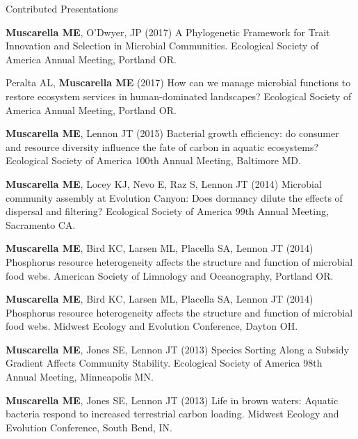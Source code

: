 \documentclass{resume} %
\begin{document}
\begin{rSection}{Contributed Presentations}

{\bf Muscarella ME}, O'Dwyer, JP (2017) A Phylogenetic Framework for Trait
 Innovation and Selection in Microbial Communities. Ecological Society of America Annual Meeting, Portland OR.

Peralta AL, {\bf Muscarella ME} (2017) How can we manage microbial functions to restore ecosystem services in human-dominated landscapes? Ecological Society of America Annual Meeting, Portland OR.

  {\bf Muscarella ME}, Lennon JT (2015) Bacterial growth efficiency: do
  consumer and resource diversity influence the fate of carbon in aquatic
  ecosystems? Ecological Society of America 100th Annual Meeting, Baltimore MD.

  {\bf Muscarella ME}, Locey KJ, Nevo E, Raz S, Lennon JT (2014) Microbial
  community assembly at Evolution Canyon: Does dormancy dilute the effects of
  dispersal and filtering? Ecological Society of America 99th Annual Meeting,
  Sacramento CA.

  {\bf Muscarella ME}, Bird KC, Larsen ML, Placella SA, Lennon JT (2014)
  Phosphorus resource heterogeneity affects the structure and function of
  microbial food webs. American Society of Limnology and Oceanography, Portland
  OR.

  {\bf Muscarella ME}, Bird KC, Larsen ML, Placella SA, Lennon JT (2014)
  Phosphorus resource heterogeneity affects the structure and function of
  microbial food webs. Midwest Ecology and Evolution Conference, Dayton OH.

  {\bf Muscarella ME}, Jones SE, Lennon JT (2013) Species Sorting Along a
  Subsidy Gradient Affects Community Stability. Ecological Society of America
  98th Annual Meeting, Minneapolis MN.

  {\bf Muscarella ME}, Jones SE, Lennon JT (2013) Life in brown waters: Aquatic
  bacteria respond to increased terrestrial carbon loading. Midwest Ecology and
  Evolution Conference, South Bend, IN.


\end{rSection}
\end{document}
